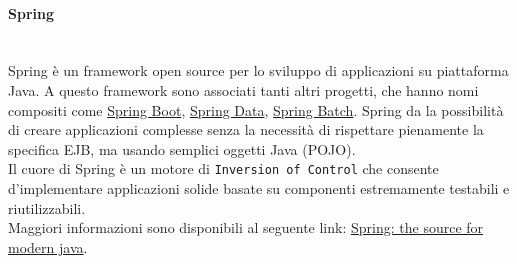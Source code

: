 \label{sec:Spring}
\paragraph{Spring}\mbox{}\\
Spring è un framework open source per lo sviluppo di applicazioni su piattaforma Java. A questo framework sono associati tanti altri progetti, che hanno nomi compositi come \href{https://spring.io/projects/spring-boot}{Spring Boot}, \href{https://spring.io/projects/spring-data}{Spring Data}, \href{https://spring.io/projects/spring-batch}{Spring Batch}. 
Spring da la possibilità di creare applicazioni complesse senza la necessità di rispettare pienamente la specifica {EJB}, ma usando semplici oggetti Java ({POJO}).\\
Il cuore di Spring è un motore di \texttt{{Inversion of Control}} che consente d'implementare applicazioni solide basate su componenti estremamente testabili e riutilizzabili.\\
Maggiori informazioni sono disponibili al seguente link: \href{https://spring.io/}{Spring: the source for modern java}. 


